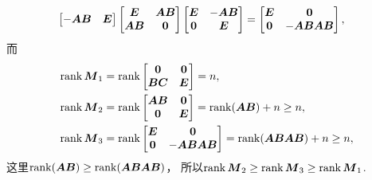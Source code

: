 \begin{example}
\begin{solution}
\begin{align*}
\begin{bmatrix}
		-\boldsymbol{A} \boldsymbol{B} & \boldsymbol{E}
	\end{bmatrix}
	\begin{bmatrix}
		\boldsymbol{E} & \boldsymbol{A} \boldsymbol{B} \\
		\boldsymbol{A} \boldsymbol{B} & \boldsymbol0
	\end{bmatrix}
	\begin{bmatrix}
		\boldsymbol{E} & -\boldsymbol{A} \boldsymbol{B} \\
		\boldsymbol0 & \boldsymbol{E}
	\end{bmatrix}
	&= \begin{bmatrix}
		\boldsymbol{E} & \boldsymbol0 \\
		\boldsymbol0 & -\boldsymbol{A} \boldsymbol{B} \boldsymbol{A} \boldsymbol{B}
	\end{bmatrix},
\end{align*}
而\begin{align*}
	\rank\boldsymbol{M}_1
	&= \rank\begin{bmatrix}
		\boldsymbol0 & \boldsymbol0 \\
		\boldsymbol{B} \boldsymbol{C} & \boldsymbol{E}
	\end{bmatrix}
	= n, \\
	\rank\boldsymbol{M}_2
	&= \rank\begin{bmatrix}
		\boldsymbol{A} \boldsymbol{B} & \boldsymbol0 \\
		\boldsymbol0 & \boldsymbol{E}
	\end{bmatrix}
	= \rank(\boldsymbol{A}\boldsymbol{B}) + n
	\geq n, \\
	\rank\boldsymbol{M}_3
	&= \rank\begin{bmatrix}
		\boldsymbol{E} & \boldsymbol0 \\
		\boldsymbol0 & -\boldsymbol{A} \boldsymbol{B} \boldsymbol{A} \boldsymbol{B}
	\end{bmatrix}
	= \rank(\boldsymbol{A} \boldsymbol{B} \boldsymbol{A} \boldsymbol{B}) + n
	\geq n,
\end{align*}
这里\(\rank(\boldsymbol{A} \boldsymbol{B}) \geq \rank(\boldsymbol{A} \boldsymbol{B} \boldsymbol{A} \boldsymbol{B})\)，
所以\(\rank\boldsymbol{M}_2 \geq \rank\boldsymbol{M}_3 \geq \rank\boldsymbol{M}_1\).
\end{solution}
\end{example}
